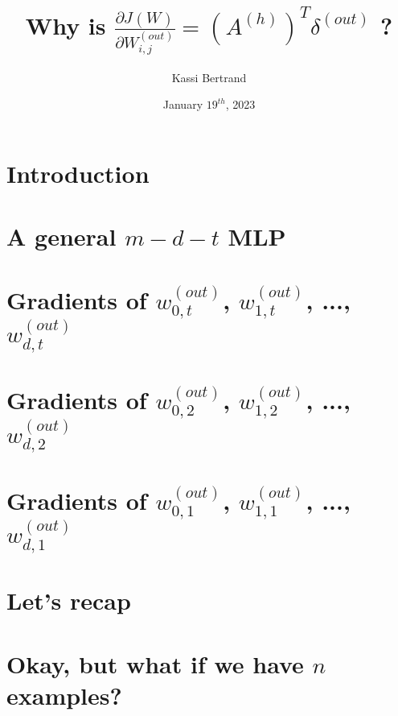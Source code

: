 \documentclass[12pt, letterpaper]{article}
\title{Why is $ \frac{\partial J(W)}{\partial W_{i,j}^{(out)}} = (A^{(h)})^{T} \delta^{(out)}$ ?}
\author{Kassi Bertrand}
\date{January $19^{th}$, 2023}
\begin{document}
\maketitle

\section{Introduction}


\pagebreak
\section{A general $m-d-t$ MLP}


\section{Gradients of $w_{0,t}^{(out)}$, $w_{1,t}^{(out)}$, ..., $w_{d,t}^{(out)}$}


\pagebreak
\section{Gradients of $w_{0,2}^{(out)}$, $w_{1,2}^{(out)}$, ..., $w_{d,2}^{(out)}$}


\pagebreak
\section{Gradients of $w_{0,1}^{(out)}$, $w_{1,1}^{(out)}$, ..., $w_{d,1}^{(out)}$}


\pagebreak
\section{Let's recap}


\pagebreak
\section{Okay, but what if we have $n$ examples?}

\end{document}
